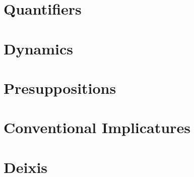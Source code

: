 \documentclass{report}
\begin{document}
\section{Quantifiers}
\section{Dynamics}
\section{Presuppositions}
\section{Conventional Implicatures}
\section{Deixis}


\end{document}
